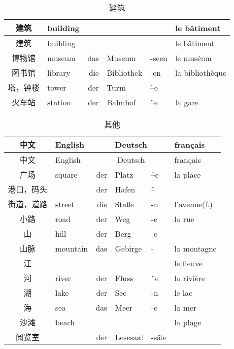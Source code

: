 \documentclass[12pt,A4paper,oneside,reqno]{amsart}
\numberwithin{equation}{section}
\theoremstyle{plain}
\theoremstyle{plain}
\theoremstyle{plain}
\numberwithin{equation}{section}
\theoremstyle{remark}
\begin{document}
\begin{longtable}{c|l|rll|l}
	\hline
建筑	&	building	&		&		&		&	le b\^{a}timent	\\

	\hline
	\endhead
	\hline
建筑	&	building	&		&		&		&	le b\^{a}timent	\\

	\hline
	\endfirsthead	
	\hline
	\endfoot
	\hline	
	\caption{建筑}
	\endlastfoot				
博物馆	&	museum	&	das	&	Museum	&	-seen	&	le mus\'{e}um	\\
图书馆	&	library	&	die	&	Bibliothek	&	-en	&	la biblioth\`{e}que	\\
塔，钟楼	&	tower	&	der	&	Turm	&	\"{--}e	&		\\
火车站	&	station	&	der	&	Bahnhof	&	\"{--}e	&	la gare	\\


	
\end{longtable}
\begin{longtable}{c|l|rll|l}
	\hline
	中文	&	English	&\multicolumn{3}{c|}{Deutsch} &	français  	\\
	\hline
	\endhead
	\hline
	中文	&	English	&\multicolumn{3}{c|}{Deutsch} &	français  	\\
	\hline
	\endfirsthead	
	\hline
	\endfoot
	\hline	
	\caption{其他}
	\endlastfoot				
广场	&	square	&	der	&	Platz	&	\"{--}e	&	la place	\\
港口，码头	&		&	der	&	Hafen	&	\"{--}	&		\\
街道，道路	&	street	&	die	&	Sta\ss e	&	-n	&	l'avenue(f.)	\\
小路	&	road	&	der	&	Weg	&	-e	&	la rue	\\
山	&	hill	&	der	&	Berg	&	-e	&		\\
山脉	&	mountain	&	das	&	Gebirge	&	-	&	la montagne	\\
江	&		&		&		&		&	le fleuve	\\
河	&	river	&	der	&	Fluss	&	\"{--}e	&	la rivi\`{e}re	\\
湖	&	lake	&	der	&	See	&	-n	&	le lac	\\
海	&	sea	&	das	&	Meer	&	-e	&	la mer	\\
沙滩	&	beach	&		&		&		&	la plage	\\
阅览室	&		&	der	&	Lesesaal	&	-s\"{a}le	&		\\


\end{longtable}
\end{document}
